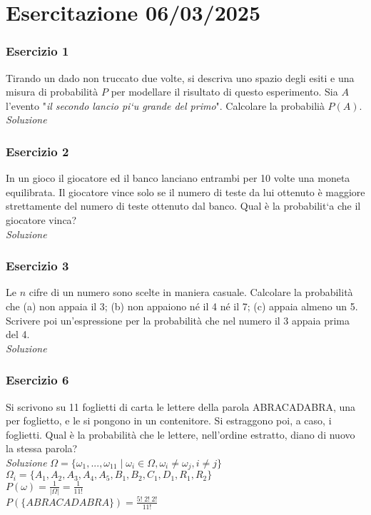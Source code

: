 \section{Esercitazione 06/03/2025}
\subsubsection{Esercizio 1}
Tirando un dado non truccato due volte, si descriva uno spazio degli esiti e una misura di probabilità $P$ per modellare il risultato di questo esperimento. Sia $A$ l’evento "\textit{il secondo lancio pi`u grande del primo}". Calcolare la probabilià $P(A)$.
\\

\textit{Soluzione} \quad 

\subsubsection{Esercizio 2}
In un gioco il giocatore ed il banco lanciano entrambi per 10 volte una moneta equilibrata. Il giocatore vince solo se il numero di teste da lui ottenuto è maggiore strettamente del numero di teste ottenuto dal banco. Qual è la probabilit`a che il giocatore vinca?
\\

\textit{Soluzione} \quad 

\subsubsection{Esercizio 3}
Le $n$ cifre di un numero sono scelte in maniera casuale. Calcolare la probabilità che
(a) non appaia il 3;
(b) non appaiono né il 4 né il 7; (c) appaia almeno un 5.
Scrivere poi un’espressione per la probabilità che nel numero il 3 appaia prima del 4.
\\

\textit{Soluzione} \quad 

\subsubsection{Esercizio 6} Si scrivono su 11 foglietti di carta le lettere della parola ABRACADABRA, una per foglietto, e le si pongono in un contenitore. Si estraggono poi, a caso, i foglietti. Qual è la probabilità che le lettere, nell’ordine estratto, diano di nuovo la stessa parola?
\\

\textit{Soluzione} \quad 
$\Omega =\{\omega_1,...,\omega_{11} \; | \; \omega_i \in \Omega, \omega_i \ne \omega_j , i\ne j\}$ 
\\

$\Omega_i = \{A_1,A_2,A_3,A_4,A_5,B_1,B_2,C_1,D_1,R_1,R_2\}$ 
\\

$P(\omega)=\frac{1}{|\Omega|}=\frac{1}{11!}$
\\

$P(\{ABRACADABRA\})=\frac{5! \;2!\; 2!}{11!}$

